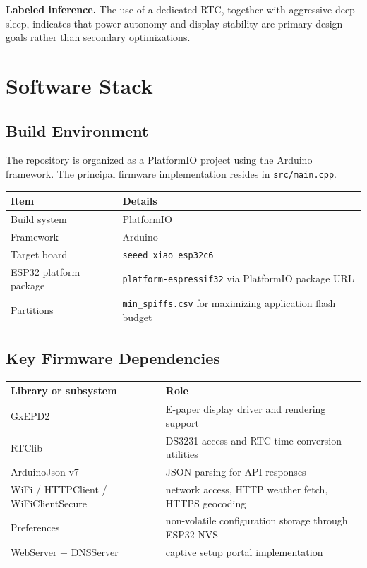 \documentclass[11pt]{article}
\begin{document}
\textbf{Labeled inference.} The use of a dedicated RTC, together with aggressive deep sleep, indicates that power autonomy and display stability are primary design goals rather than secondary optimizations.

\section{Software Stack}
\subsection{Build Environment}
The repository is organized as a PlatformIO project using the Arduino framework. The principal firmware implementation resides in \texttt{src/main.cpp}.

\begin{longtable}{>{\raggedright\arraybackslash}p{} >{\raggedright\arraybackslash}p{}}
\toprule
Item & Details \\
\midrule
Build system & PlatformIO \\
Framework & Arduino \\
Target board & \texttt{seeed\_xiao\_esp32c6} \\
ESP32 platform package & \texttt{platform-espressif32} via PlatformIO package URL \\
Partitions & \texttt{min\_spiffs.csv} for maximizing application flash budget \\
\bottomrule
\end{longtable}

\subsection{Key Firmware Dependencies}
\begin{longtable}{>{\raggedright\arraybackslash}p{} >{\raggedright\arraybackslash}p{}}
\toprule
Library or subsystem & Role \\
\midrule
GxEPD2 & E-paper display driver and rendering support \\
RTClib & DS3231 access and RTC time conversion utilities \\
ArduinoJson v7 & JSON parsing for API responses \\
WiFi / HTTPClient / WiFiClientSecure & network access, HTTP weather fetch, HTTPS geocoding \\
Preferences & non-volatile configuration storage through ESP32 NVS \\
WebServer + DNSServer & captive setup portal implementation \\
\bottomrule
\end{longtable}
\end{document}
